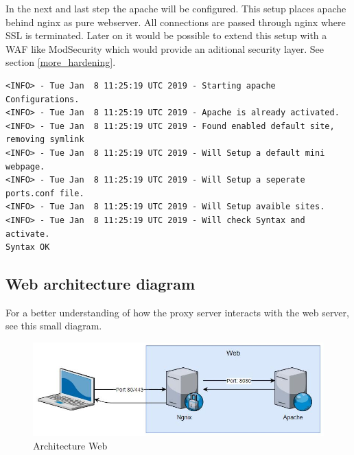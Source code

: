 In the next and last step the apache will be configured. This setup places apache behind nginx as pure webserver.
All connections are passed through nginx where SSL is terminated. Later on it would be possible to extend this setup with a \gls{WAF} like \gls{ModSecurity} which would provide an aditional security layer. See section \ref{more_hardening}.
\begin{lstlisting}
<INFO> - Tue Jan  8 11:25:19 UTC 2019 - Starting apache Configurations.
<INFO> - Tue Jan  8 11:25:19 UTC 2019 - Apache is already activated.
<INFO> - Tue Jan  8 11:25:19 UTC 2019 - Found enabled default site, removing symlink
<INFO> - Tue Jan  8 11:25:19 UTC 2019 - Will Setup a default mini webpage.
<INFO> - Tue Jan  8 11:25:19 UTC 2019 - Will Setup a seperate ports.conf file.
<INFO> - Tue Jan  8 11:25:19 UTC 2019 - Will Setup avaible sites.
<INFO> - Tue Jan  8 11:25:19 UTC 2019 - Will check Syntax and activate.
Syntax OK
\end{lstlisting}

\subsection{Web architecture diagram}
For a better understanding of how the proxy server interacts with the web server, see this small diagram.
\begin{figure}[H]
	\centering
	\includegraphics[width=0.9\linewidth]{diagram/web_arch_diagramm.JPG}
	\caption{Architecture Web}
	\label{fig:beforeWeb}
\end{figure}
